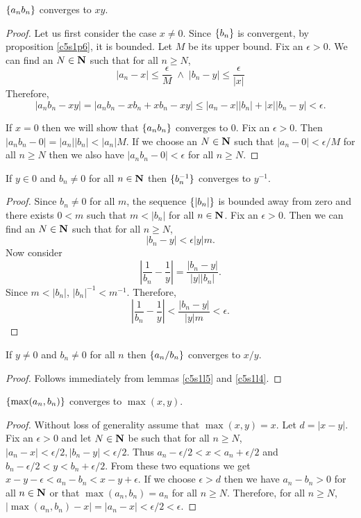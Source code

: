 \begin{lem}\label{c5s1l4}
$\{a_nb_n\}$ converges to $xy$.
\end{lem}
\begin{proof}
Let us first consider the case $x \ne 0$.
Since $\{b_n\}$ is convergent, by proposition \ref{c5s1p6}, it is bounded.
Let $M$ be its upper bound. Fix an $\epsilon > 0$. We can find an $N \in 
\mathbf{N}$ such that for all $n \ge N$,
\[
|a_n - x| \le \frac{\epsilon}{M} \;\land\; |b_n - y| \le \frac{\epsilon}{|x|}
\]
Therefore,
\[
|a_nb_n - xy| = |a_nb_n - xb_n + xb_n - xy| \le |a_n - x||b_n| + |x||b_n - y|
< \epsilon.
\]

If $x = 0$ then we will show that $\{a_nb_n\}$ converges to $0$. Fix an
$\epsilon > 0$. Then $|a_nb_n - 0| = |a_n||b_n| < |a_n|M$. If we choose an
$N \in \mathbf{N}$ such that $|a_n - 0| < \epsilon/M$ for all $n \ge N$ then we
also have $|a_nb_n - 0| < \epsilon$ for all $n \ge N$.
\end{proof}

\begin{lem}\label{c5s1l5}
If $y \in 0$ and $b_n \ne 0$ for all $n \in \mathbf{N}$ then $\{b_n^{-1}\}$
converges to $y^{-1}$.
\end{lem}
\begin{proof}
Since $b_n \ne 0$ for all $m$, the sequence $\{|b_n|\}$ is bounded away
from zero and there exists $0 < m$ such that $m < |b_n|$ for all $n \in
\mathbf{N}$. Fix an $\epsilon > 0$. Then we can find an $N \in \mathbf{N}$ such that
for all $n \ge N$, 
\[
|b_n - y| < \epsilon|y|m.
\]
Now consider
\[
\left|\frac{1}{b_n} - \frac{1}{y}\right| = \frac{|b_n - y|}{|y||b_n|}.
\]
Since $m < |b_n|$, $|b_n|^{-1} < m^{-1}$. Therefore,
\[
\left|\frac{1}{b_n} - \frac{1}{y}\right| < \frac{|b_n - y|}{|y|m} <
\epsilon.
\]
\end{proof}

\begin{lem}\label{c5s1l6}
If $y \ne 0$ and $b_n \ne 0$ for all $n$ then $\{a_n/b_n\}$ converges
to $x/y$.
\end{lem}
\begin{proof}
Follows immediately from lemmas \ref{c5s1l5} and \ref{c5s1l4}.
\end{proof}

\begin{lem}\label{c5s1l7}
$\{\max(a_n, b_n)\}$ converges to $\max(x, y)$.
\end{lem}
\begin{proof}
Without loss of generality assume that $\max(x, y) = x$. Let $d = |x - y|$. 
Fix an $\epsilon > 0$ and let $N \in \mathbf{N}$ be such that for all $n \ge N$,
$|a_n - x| < \epsilon/2, |b_n - y| < \epsilon/2$. Thus $a_n - \epsilon/2 < 
x < a_n + \epsilon/2$ and $b_n - \epsilon/2 < y < b_n + \epsilon/2$. From
these two equations we get $x - y - \epsilon < a_n - b_n < x - y + \epsilon$.
If we choose $\epsilon > d$ then we have $a_n - b_n > 0$ for all $n \in 
\mathbf{N}$ or that $\max(a_n, b_n) = a_n$ for all $n \ge N$. Therefore, for 
all $n \ge N$, $|\max(a_n, b_n) - x| = |a_n - x| < \epsilon/2 < \epsilon$.
\end{proof}

